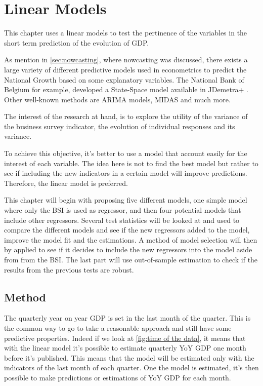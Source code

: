 \documentclass[12pt,a4paper,oneside]{book}
\begin{document}
\chapter{Linear Models}

This chapter uses a linear models to test the pertinence of the variables in the short term prediction of the evolution of GDP.

As mention in \autoref{sec:nowcasting}, where nowcasting was discussed, there exists a large variety of different predictive models used in econometrics to predict the National Growth based on some explanatory variables.
The National Bank of Belgium for example, developed a State-Space model available in JDemetra+ \cite{de_antonio_liedo_nowcasting_2014}. Other well-known methods are ARIMA models, MIDAS and much more.

The interest of the research at hand, is to explore the utility of the variance of the business survey indicator, the evolution of individual responses and its variance.

To achieve this objective, it's better to use a model that account easily for the interest of each variable. The idea here is not to find the best model but rather to see if including the new indicators in a certain model will improve predictions.
Therefore, the linear model is preferred.

This chapter will begin with proposing five different models, one simple model where only the BSI is used as regressor, and then four potential models that include other regressors.
Several test statistics will be looked at and used to compare the different models and see if the new regressors added to the model, improve the model fit and the estimations.
A method of model selection will then by applied to see if it decides to include the new regressors into the model aside from from the BSI.
The last part will use out-of-sample estimation to check if the results from the previous tests are robust.

\section{Method}

The quarterly year on year GDP is set in the last month of the quarter. This is the common way to go to take a reasonable approach and still have some predictive properties.
Indeed if we look at \autoref{fig:time of the data}, it means that with the linear model it's possible to estimate quarterly YoY GDP one month before it's published. 
This means that the model will be estimated only with the indicators of the last month of each quarter. One the model is estimated, it's then possible to make predictions or estimations of YoY GDP for each month.
\end{document}
